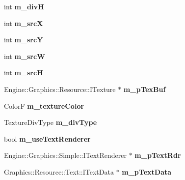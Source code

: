 \begin{DoxyCompactItemize}
\item 
int {\bfseries m\+\_\+divH}\hypertarget{class_sprite_a32a9fe14ba4a968560c8bf16a514c632}{}\label{class_sprite_a32a9fe14ba4a968560c8bf16a514c632}

\item 
int {\bfseries m\+\_\+srcX}\hypertarget{class_sprite_a6d9092d0007588dff19470a7f550a37e}{}\label{class_sprite_a6d9092d0007588dff19470a7f550a37e}

\item 
int {\bfseries m\+\_\+srcY}\hypertarget{class_sprite_a716aa1d64bf6ac00379f081259fde67b}{}\label{class_sprite_a716aa1d64bf6ac00379f081259fde67b}

\item 
int {\bfseries m\+\_\+srcW}\hypertarget{class_sprite_a97bafb109664b59eb7ca390c5cead173}{}\label{class_sprite_a97bafb109664b59eb7ca390c5cead173}

\item 
int {\bfseries m\+\_\+srcH}\hypertarget{class_sprite_a9ac3b201e89ec36289e07d1c2fd5eb2e}{}\label{class_sprite_a9ac3b201e89ec36289e07d1c2fd5eb2e}

\item 
Engine\+::\+Graphics\+::\+Resource\+::\+I\+Texture $\ast$ {\bfseries m\+\_\+p\+Tex\+Buf}\hypertarget{class_sprite_a6dcba95237c988ed4d993a8ff4ca658f}{}\label{class_sprite_a6dcba95237c988ed4d993a8ff4ca658f}

\item 
ColorF {\bfseries m\+\_\+texture\+Color}\hypertarget{class_sprite_aea3e77cd97e5cc826a07475ac06f3f7c}{}\label{class_sprite_aea3e77cd97e5cc826a07475ac06f3f7c}

\item 
Texture\+Div\+Type {\bfseries m\+\_\+div\+Type}\hypertarget{class_sprite_a9fd5ed190dec101502564732eaba8427}{}\label{class_sprite_a9fd5ed190dec101502564732eaba8427}

\item 
bool {\bfseries m\+\_\+use\+Text\+Renderer}\hypertarget{class_sprite_afc5e6315b779d8550fd081079984b209}{}\label{class_sprite_afc5e6315b779d8550fd081079984b209}

\item 
Engine\+::\+Graphics\+::\+Simple\+::\+I\+Text\+Renderer $\ast$ {\bfseries m\+\_\+p\+Text\+Rdr}\hypertarget{class_sprite_a4d3975b753781c3eb457539bea6c80fe}{}\label{class_sprite_a4d3975b753781c3eb457539bea6c80fe}

\item 
Graphics\+::\+Resource\+::\+Text\+::\+I\+Text\+Data $\ast$ {\bfseries m\+\_\+p\+Text\+Data}\hypertarget{class_sprite_aba79582eaee4411ad7971f706a259f70}{}\label{class_sprite_aba79582eaee4411ad7971f706a259f70}


\end{DoxyCompactItemize}
